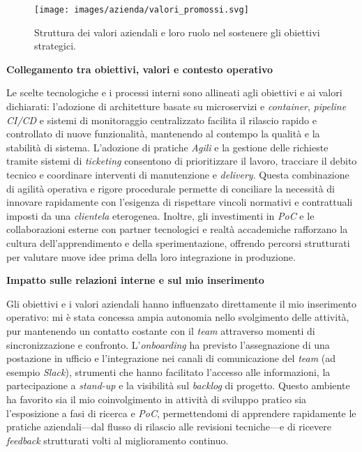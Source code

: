 \begin{figure}[htbp]
    \centering
    \texttt{[image: images/azienda/valori\_promossi.svg]}
    \caption{Struttura dei valori aziendali e loro ruolo nel sostenere gli obiettivi strategici.}
    \label{fig:valori}
\end{figure}


\medskip
\noindent\textbf{Collegamento tra obiettivi, valori e contesto operativo}

Le scelte tecnologiche e i processi interni sono allineati agli obiettivi e ai valori dichiarati: l'adozione di architetture basate su microservizi e \emph{container},
\emph{pipeline} \emph{CI/CD} e sistemi di monitoraggio centralizzato facilita il rilascio rapido e controllato di nuove funzionalità, mantenendo al contempo la qualità e la stabilità di sistema.
L'adozione di pratiche \emph{Agili} e la gestione delle richieste tramite sistemi di \emph{ticketing} consentono di prioritizzare il lavoro, tracciare il debito tecnico e coordinare interventi
di manutenzione e \emph{delivery}. Questa combinazione di agilità operativa e rigore procedurale permette di conciliare la necessità di innovare rapidamente con l'esigenza di rispettare
vincoli normativi e contrattuali imposti da una \emph{clientela} eterogenea. Inoltre, gli investimenti in \emph{PoC} e le collaborazioni esterne con partner tecnologici e realtà accademiche
rafforzano la cultura dell'apprendimento e della sperimentazione, offrendo percorsi strutturati per valutare nuove idee prima della loro integrazione in produzione.

\medskip
\noindent\textbf{Impatto sulle relazioni interne e sul mio inserimento}

Gli obiettivi e i valori aziendali hanno influenzato direttamente il mio inserimento operativo: mi è stata concessa ampia autonomia nello svolgimento delle attività,
pur mantenendo un contatto costante con il \emph{team} attraverso momenti di sincronizzazione e confronto. L'\emph{onboarding} ha previsto l'assegnazione di una postazione in ufficio e
l'integrazione nei canali di comunicazione del \emph{team} (ad esempio \emph{Slack}), strumenti che hanno facilitato l'accesso alle informazioni, la partecipazione a \emph{stand-up} e la
visibilità sul \emph{backlog} di progetto. Questo ambiente ha favorito sia il mio coinvolgimento in attività di sviluppo pratico sia l'esposizione a fasi di ricerca e \emph{PoC},
permettendomi di apprendere rapidamente le pratiche aziendali—dal flusso di rilascio alle revisioni tecniche—e di ricevere \emph{feedback} strutturati volti al miglioramento continuo.